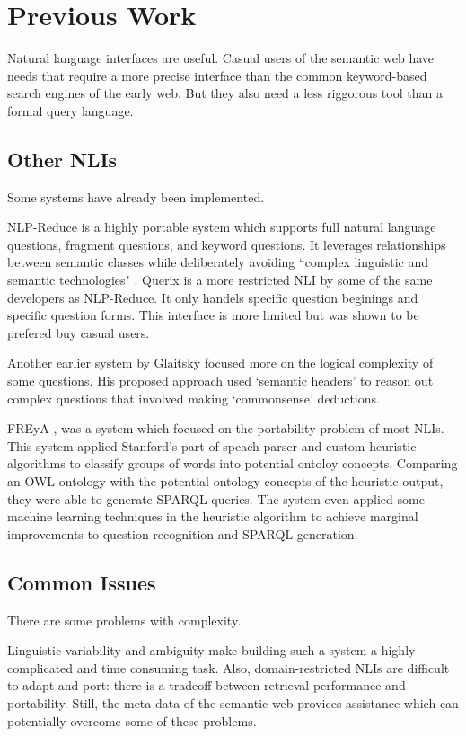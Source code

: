 \documentclass[11pt]{article}
\begin{document}
\section{Previous Work}

Natural language interfaces are useful. 
Casual users of the semantic web have needs that require a more precise interface
than the common keyword-based search engines of the early web. But they also
need a less riggorous tool than a formal query language. \cite{usability}

\subsection{Other NLIs}
Some systems have already been implemented. \cite{freya, nlp-reduce, galitsky2}

NLP-Reduce \cite{usability,nlp-reduce} is a highly portable system which supports full
natural language questions, fragment questions, and keyword questions.
It leverages relationships between semantic classes while deliberately avoiding
``complex linguistic and semantic technologies" \cite{nlp-reduce}.
Querix \cite{querix} is a more restricted NLI by some of the same developers as
NLP-Reduce. It only handels specific question beginings and specific question forms. 
This interface is more limited but was shown to be prefered buy casual 
users\cite{usability}.

Another earlier system by Glaitsky\cite{galitsky2} focused more on the logical complexity
of some questions. His proposed approach used `semantic headers' to reason out
complex questions that involved making `commonsense' deductions.

FREyA \cite{freya}, was a system which focused on the portability problem of most
NLIs. This system applied Stanford's part-of-speach parser and custom heuristic algorithms
to classify groups of words into potential ontoloy concepts. Comparing an OWL ontology
with the potential ontology concepts of the heuristic output, they were able to generate
SPARQL queries. The system even applied some machine learning techniques in the 
heuristic algorithm to achieve marginal improvements to question recognition and SPARQL
generation. 

\subsection{Common Issues}
There are some problems with complexity. \cite{issues}

Linguistic variability and ambiguity make building such a
system a highly complicated and time consuming task. Also,
domain-restricted NLIs are difficult to adapt and port:
there is a tradeoff between retrieval performance and portability. 
Still, the meta-data of the semantic web provices assistance
which can potentially overcome some of these problems. \cite{usability}
\end{document}
